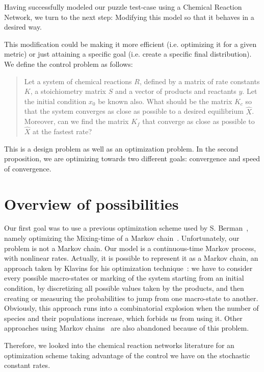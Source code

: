 Having successfully modeled our puzzle test-case using a Chemical
Reaction Network, we turn to the next step: Modifying this model so
that it behaves in a desired way.

This modification could be making it more efficient (i.e. optimizing
it for a given metric) or just attaining a specific goal (i.e.
create a specific final distribution). We define the control problem
as follows:
\begin{quote}
    Let a system of chemical reactions $R$, defined by a matrix of rate constants $K$, a stoichiometry
matrix $S$ and a vector of products and reactants $y$. Let the
initial condition $x_0$ be known also. What should be the matrix
$K_c$ so that the system converges as close as possible to a desired
equilibrium $\hat{X}$. Moreover, can we find the matrix $K_{f}$ that
converge as close as possible to $\hat{X}$ at the fastest rate?
\end{quote}

This is a design problem as well as an optimization problem. In the
second proposition, we are optimizing towards two different goals:
convergence and speed of convergence.

\section{Overview of possibilities} %

    Our first goal was to use a previous optimization scheme used by S. Berman~\cite{ref:BermanTRO08, Halasz:2007p10106}, namely optimizing the Mixing-time of a Markov chain~\cite{Randall:2006p11793, NEthier:1986p4833, Sun:2005p4975}. Unfortunately, our problem is not a Markov chain. Our model is a continuous-time Markov process, with nonlinear rates. Actually, it is possible to represent it as a Markov chain, an approach taken by Klavins for his optimization technique~\cite{Klavins:2007p2600}: we have to consider every possible macro-states or marking of the system starting from an initial condition, by discretizing all possible values taken by the products, and then creating or measuring the probabilities to jump from one macro-state to another. Obviously, this approach runs into a combinatorial explosion when the number of species and their populations increase, which forbids us from using it. Other approaches using Markov chains~\cite{Runolfsson:2007p9740, Tierney:1994p9783} are also abandoned because of this problem.

    Therefore, we looked into the chemical reaction networks literature for an optimization scheme taking advantage of the control we have on the stochastic constant rates.

